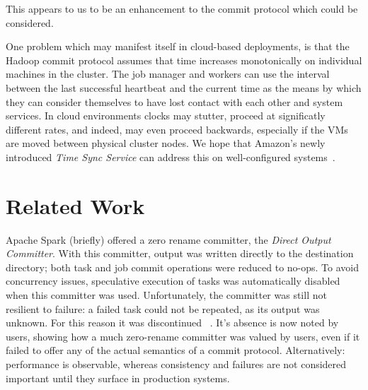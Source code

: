 \documentclass[conference]{IEEEtran}
\begin{document}
This appears to us to be an enhancement to the commit protocol which could
be considered.


One problem which may manifest itself in cloud-based deployments,
is that the Hadoop commit protocol assumes that time increases monotonically
on individual machines in the cluster.
The job manager and workers can use the interval between the last successful heartbeat
and the current time as the means by which they can consider themselves to have lost
contact with each other and system services.
In cloud environments clocks may stutter, proceed at significatly different rates,
and indeed, may even proceed backwards, especially if the VMs are moved between
physical cluster nodes.
We hope that Amazon's newly introduced \emph{Time Sync Service}
can address this on well-configured systems\ \cite{AWS-clock-service}.



\section{Related Work}
\label{sec:relatedWork}

Apache Spark (briefly) offered a zero rename committer,
the \emph{Direct Output Committer}.
With this committer, output was written directly to the destination directory;
both task and job commit operations were reduced to no-ops.
To avoid concurrency issues, speculative execution of tasks was automatically
disabled when this committer was used.
Unfortunately, the committer was still not resilient to failure: a failed
task could not be repeated, as its output was unknown.
For this reason it was discontinued \ \cite{SPARK-10063}.
It's absence is now noted by users, showing how a much zero-rename committer
was valued by users, even if it failed to offer any of the actual semantics
of a commit protocol.
Alternatively: performance is observable, whereas consistency and failures
are not considered important until they surface in production systems.
\end{document}
